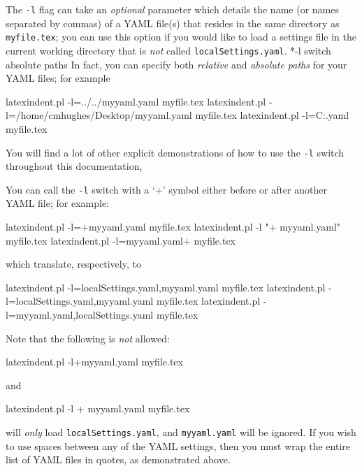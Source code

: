  The \texttt{-l} flag can take an \emph{optional} parameter which details the name (or
 names separated by commas) of a YAML file(s) that resides in the same directory as
 \texttt{myfile.tex}; you can use this option if you would like to load a settings file in
 the current working directory that is \emph{not} called \texttt{localSettings.yaml}.
 *{-l switch absolute paths} In fact, you can specify both
 \emph{relative} and \emph{absolute paths} for your YAML files; for example%
 \begin{commandshell}
latexindent.pl -l=../../myyaml.yaml myfile.tex
latexindent.pl -l=/home/cmhughes/Desktop/myyaml.yaml myfile.tex
latexindent.pl -l=C:\Users\cmhughes\Desktop\myyaml.yaml myfile.tex
\end{commandshell}
 You will find a lot of other explicit demonstrations of how to use the \texttt{-l} switch
 throughout this documentation,

 You can call the \texttt{-l} switch with a `+' symbol either before or after
  another YAML file; for example:
 \begin{commandshell}
latexindent.pl -l=+myyaml.yaml myfile.tex
latexindent.pl -l "+ myyaml.yaml" myfile.tex
latexindent.pl -l=myyaml.yaml+  myfile.tex
\end{commandshell}
 which translate, respectively, to
 \begin{commandshell}
latexindent.pl -l=localSettings.yaml,myyaml.yaml myfile.tex
latexindent.pl -l=localSettings.yaml,myyaml.yaml myfile.tex
latexindent.pl -l=myyaml.yaml,localSettings.yaml myfile.tex
\end{commandshell}
 Note that the following is \emph{not} allowed:
 \begin{commandshell}
latexindent.pl -l+myyaml.yaml myfile.tex
\end{commandshell}
 and
 \begin{commandshell}
latexindent.pl -l + myyaml.yaml myfile.tex
\end{commandshell}
 will \emph{only} load \texttt{localSettings.yaml}, and \texttt{myyaml.yaml} will be
 ignored. If you wish to use spaces between any of the YAML settings, then you must wrap
 the entire list of YAML files in quotes, as demonstrated above.

